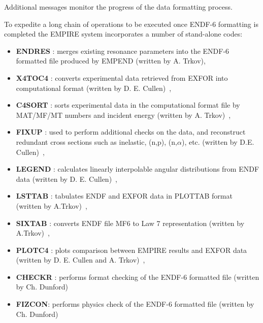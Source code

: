 Additional messages monitor the progress of the data formatting process.

To expedite a long chain of operations to be executed once ENDF-6 formatting
is completed the EMPIRE system incorporates a number of stand-alone codes:

\begin{itemize}
\item \textbf{ENDRES%
}: merges existing resonance parameters into the ENDF-6 formatted
file produced by EMPEND (written by A. Trkov),

\item \textbf{X4TOC4%
}: converts experimental data retrieved from EXFOR into
computational format (written by D. E. Cullen)~\cite{PREPRO},

\item \textbf{C4SORT%
}: sorts experimental data in the computational format file by
MAT/MF/MT numbers and incident energy (written by A. Trkov)~\cite{ENDVER},

\item \textbf{FIXUP%
}: used to perform additional checks on the data, and
reconstruct redundant cross sections such as inelastic, (n,p), (n,$\alpha$),
etc. (written by D.E. Cullen)~\cite{PREPRO},

\item \textbf{LEGEND%
}: calculates linearly interpolable angular distributions from
ENDF data (written by D. E. Cullen)~\cite{PREPRO},

\item \textbf{LSTTAB%
}: tabulates ENDF and EXFOR data in PLOTTAB format (written by
A.Trkov)~\cite{ENDVER},

\item \textbf{SIXTAB%
}: converts ENDF file MF6 to Law 7 representation (written by
A.Trkov)~\cite{ENDVER},

\item \textbf{PLOTC4%
}: plots comparison between EMPIRE results and EXFOR data
(written by D. E. Cullen and A. Trkov)~\cite{ENDVER},

\item \textbf{CHECKR%
}: performs format checking of the ENDF-6 formatted file
(written by Ch. Dunford)

\item \textbf{FIZCON}: performs physics check of the ENDF-6 formatted file
(written by Ch. Dunford)


\end{itemize}
